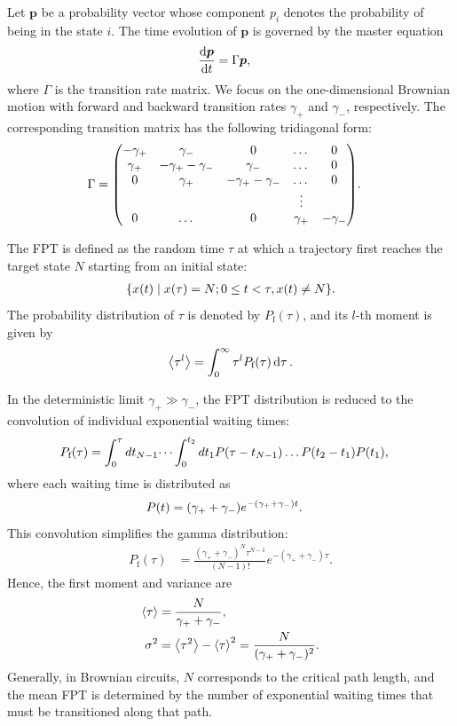 \documentclass[%
 reprint,
superscriptaddress,
 amsmath,amssymb,
 aps,
 prx,
]{revtex4-2}
\begin{document}
Let $\bm{p}$ be a probability vector whose component $p_i$ denotes the probability of being in the state $i$. The time evolution of $\bm{p}$ is governed by the master equation 
\begin{align}
    \dv{\bm{p}}{t} &= \Gamma \bm{p} \label{master equation}, 
\end{align}
where $\Gamma$ is the transition rate matrix.  
We focus on the one-dimensional Brownian motion with forward and backward transition rates $\gamma_+$ and $\gamma_-$, respectively. The corresponding transition matrix has the following tridiagonal form:  
\begin{align} 
    \Gamma &= \mqty(- \gamma_+ & \gamma_- & 0 & \dots & 0 \\ \gamma_+ & - \gamma_+ - \gamma_- & \gamma_- & \dots & 0 \\ 0 & \gamma_+ & - \gamma_+ - \gamma_- & \dots & 0 \\ &&& \vdots \\ 0 & \dots & 0 & \gamma_+ & - \gamma_-). 
\end{align}

The FPT is defined as the random time $\tau$ at which a trajectory first reaches the target state $N$ starting from an initial state:
\begin{gather}
    \qty{x(t)\mid x(\tau) = N ; 0 \leq t < \tau , x(t) \neq N}. 
\end{gather}
The probability distribution of $\tau$ is denoted by $P_\text{f}(\tau)$, and its $l$-th moment is given by
\begin{align}
    \expval{\tau^l} = \int_0^\infty \tau^l P_\text{f} (\tau) \dd{\tau}.
\end{align}

In the deterministic limit $\gamma_+ \gg \gamma_-$, the FPT distribution is reduced to the convolution of individual exponential waiting times:  
\begin{align}
    P_\text{f}(\tau) &= \int_0^\tau dt_{N-1} \dots \int_0^{t_2} dt_1 P(\tau - t_{N-1}) \dots P(t_2 - t_1) P(t_1), \notag 
\end{align}
where each waiting time is distributed as 
\begin{align}
    P(t) &= (\gamma_++\gamma_-) e^{-(\gamma_++\gamma_-)t}. \notag 
\end{align}
This convolution simplifies the gamma distribution:  
\begin{align}
    P_\text{f}(\tau) 
    &= \frac{(\gamma_++\gamma_-)^N \tau^{N-1}}{(N-1)!} e^{-(\gamma_++\gamma_-) \tau}. 
    \label{deterministic limit solution}
\end{align}
Hence, the first moment and variance are  
\begin{align}
    \expval{\tau} &= \frac{N}{\gamma_++\gamma_-}, \\
    \sigma^2&=\expval{\tau^2}-\expval{\tau}^2=\frac{N}{(\gamma_++\gamma_-)^2}. 
\end{align}
Generally, in Brownian circuits, $N$ corresponds to the critical path length, and the mean FPT is determined by the number of exponential waiting times that must be transitioned along that path. 
\end{document}
